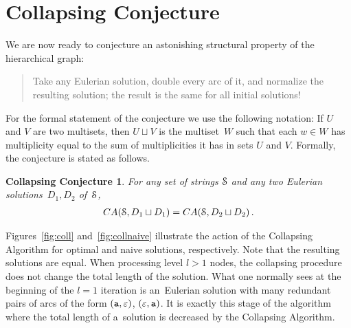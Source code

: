 \section{Collapsing Conjecture}
\label{sec:collapsing}

We are now ready to conjecture an astonishing structural property of the hierarchical graph: 
\begin{quote}
Take any Eulerian solution, double every arc of it, and normalize the resulting solution; the result is the same for all initial solutions!
\end{quote}
For the formal statement of the conjecture we use the following notation:  If $U$ and $V$ are two multisets, then $U\sqcup V$ is the multiset~$W$ such that each $w\in W$ has multiplicity equal to the sum of multiplicities it has in sets $U$ and $V$.
Formally, the conjecture is stated as follows.
\newtheorem*{scs}{Collapsing Conjecture}
\begin{scs}
For any set of strings ${\cal S}$ and any two Eulerian solutions~$D_1, D_2$ of~${\cal S}$, 
\begin{align*}
CA({\cal S}, D_1 \sqcup D_1) =  CA({\cal S}, D_2 \sqcup D_2) \, .
\end{align*}
\end{scs}

Figures~\ref{fig:coll} and~\ref{fig:collnaive} illustrate the action of
the Collapsing Algorithm for optimal and naive solutions, respectively. Note that the resulting solutions are equal. When processing level $l>1$ nodes, 
the collapsing procedure does not change the total length of the solution. What one normally sees at the beginning of the
$l=1$ iteration is an~Eulerian solution with many 
redundant pairs of arcs of the form $({\tt a}, \varepsilon)$, $(\varepsilon, {\tt a})$. It is exactly this stage of the algorithm where the total length of a~solution is decreased by the Collapsing Algorithm. 

